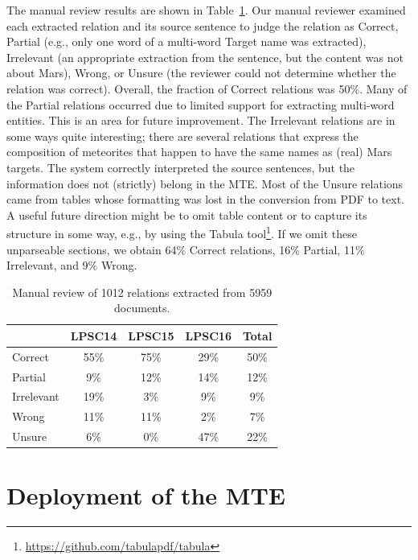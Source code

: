 \documentclass[letterpaper]{article} %
\begin{document}
The manual review results are shown in Table~\ref{tab:large}.  Our
manual reviewer examined each extracted relation and its source
sentence to judge the relation as Correct, Partial (e.g., only one
word of a multi-word Target name was extracted), Irrelevant (an
appropriate 
extraction from the sentence, but the content was not about Mars),
Wrong, or Unsure (the reviewer could not determine whether the
relation was correct).
%
Overall, the fraction of Correct relations was 50\%.  Many of the
Partial relations occurred due to limited support for extracting
multi-word entities.  This is an area for future improvement.
The Irrelevant relations are in some ways quite interesting;
there are several relations that express the composition of meteorites
that happen to have the same names as (real) Mars targets.  The system
correctly interpreted the source sentences, but the information does
not (strictly) belong in the MTE.
%
Most of the Unsure relations came from tables whose formatting was
lost in the conversion from PDF to text.  A useful future direction
might be to omit table content or to capture its structure in some
way, e.g., by using the Tabula
tool\footnote{\url{https://github.com/tabulapdf/tabula}}.  If we omit
these unparseable sections, we obtain 64\% Correct 
relations, 16\% Partial, 11\% Irrelevant, and 9\% Wrong.

\begin{table}
\caption{Manual review of 1012 relations extracted from 5959 documents.} 
\label{tab:large}
\begin{center}
\begin{tabular}{l|ccc|c}
        & LPSC14 & LPSC15 & LPSC16 & Total \\ \hline
Correct    & 55\% & 75\% & 29\% & 50\% \\ \hline
Partial    &  9\% & 12\% & 14\% & 12\% \\
Irrelevant & 19\% &  3\% &  9\% &  9\% \\
Wrong      & 11\% & 11\% &  2\% &  7\% \\
Unsure     &  6\% &  0\% & 47\% & 22\% \\
\hline
\end{tabular}
\end{center}
\end{table}

\section{Deployment of the MTE}
\end{document}
